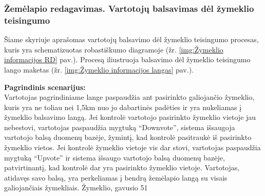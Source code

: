 \documentclass{VUMIFPSkursinis}
\begin{document}
\subsubsection{Žemėlapio redagavimas. Vartotojų balsavimas dėl žymeklio teisingumo}
	Šiame skyriuje aprašomas vartotojų balsavimo dėl žymeklio teisingumo procesas, kuris yra schematizuotas robastiškumo diagramoje (žr. \ref{img:Žymeklio informacijos RD} pav.). 
	Procesą iliustruoja balsavimo dėl žymeklio teisingumo lango maketas (žr. \ref{img:Žymeklio informacijos langas} pav.).

	\textbf{Pagrindinis scenarijus:}\\
	Vartotojas pagrindiniame lange paspaudžia ant pasirinkto galiojančio žymeklio, kuris yra ne toliau nei 1,5km nuo jo dabartinės padėties ir yra nukeliamas į žymeklio balsavimo langą. Jei kontrolė vartotojo pasirinkto žymeklio vietoje jau nebestovi, vartotojas paspaudžia mygtuką “Downvote”, sistema išsaugoja vartotojo balsą duomenų bazėje, žymintį, kad kontrolė pasitraukė iš pasirinkto žymeklio vietos. Jei kontrolė žymeklio vietoje vis dar stovi, vartotojas paspaudžia mygtuką “Upvote” ir sistema išsaugo vartotojo balsą duomenų bazėje, patvirtinantį, kad kontrolė dar yra pasirinkto žymeklio vietoje. Vartotojas, atidavęs savo balsą, yra perkeliamas į bendrą žemėlapio langą su visais galiojančiais žymekliais. Žymeklio, gavusio 51%
	
\end{document}
